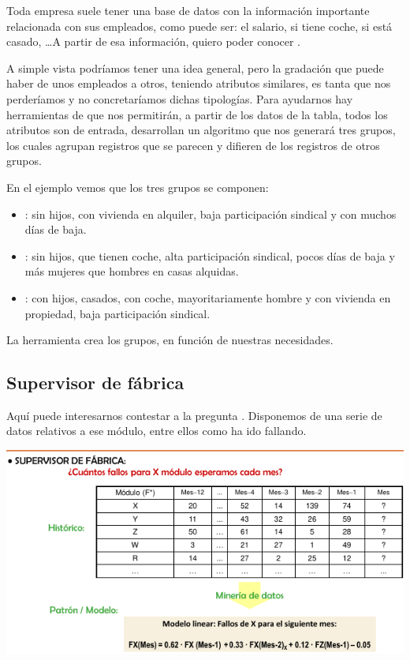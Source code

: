 Toda empresa suele tener una base de datos con la información importante relacionada con sus empleados, como puede ser: el salario, si tiene coche, si está casado, \ldots A partir de esa información, quiero poder conocer .

A simple vista podríamos tener una idea general, pero la gradación que puede haber de unos empleados a otros, teniendo atributos similares, es tanta que nos perderíamos y no concretaríamos dichas tipologías. Para ayudarnos hay herramientas de  que nos permitirán, a partir de los datos de la tabla, todos los atributos son de entrada, desarrollan un algoritmo que nos generará tres grupos, los cuales agrupan registros que se parecen y difieren de los registros de otros grupos.

En el ejemplo vemos que los tres grupos se componen:
\begin{itemize}
    \item {}: sin hijos, con vivienda en alquiler, baja participación sindical y con muchos días de baja.
    \item {}: sin hijos, que tienen coche, alta participación sindical, pocos días de baja y más mujeres que hombres en casas alquidas.
    \item {}: con hijos, casados, con coche, mayoritariamente hombre y con vivienda en propiedad, baja participación sindical.
\end{itemize}

La herramienta crea los grupos, en función de nuestras necesidades.

\subsection{Supervisor de fábrica}

Aquí puede interesarnos contestar a la pregunta . Disponemos de una serie de datos relativos a ese módulo, entre ellos como ha ido fallando.

\begin{center}
    \includegraphics[scale=.8]{images/mod01-06.png}
\end{center}

